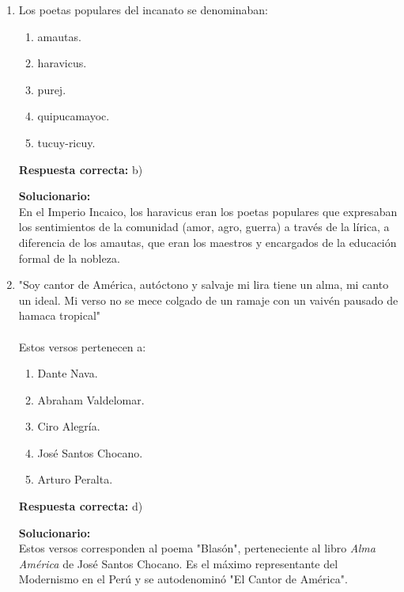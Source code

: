 \begin{enumerate}
	
	\item Los poetas populares del incanato se denominaban:
	\begin{enumerate}[label=\alph*)]
		\item amautas.
		\item haravicus.
		\item purej.
		\item quipucamayoc.
		\item tucuy-ricuy.
	\end{enumerate}
	\textbf{Respuesta correcta:} b)
	
	\vspace{2mm}
	\textbf{Solucionario:}\\
	En el Imperio Incaico, los haravicus eran los poetas populares que expresaban los sentimientos de la comunidad (amor, agro, guerra) a través de la lírica, a diferencia de los amautas, que eran los maestros y encargados de la educación formal de la nobleza.
	
	\vspace{6mm}
	
	\item "Soy cantor de América, autóctono y salvaje mi lira tiene un alma, mi canto un ideal. Mi verso no se mece colgado de un ramaje con un vaivén pausado de hamaca tropical" \\ \\ Estos versos pertenecen a:
	\begin{enumerate}[label=\alph*)]
		\item Dante Nava.
		\item Abraham Valdelomar.
		\item Ciro Alegría.
		\item José Santos Chocano.
		\item Arturo Peralta.
	\end{enumerate}
	\textbf{Respuesta correcta:} d)
	
	\vspace{2mm}
	\textbf{Solucionario:}\\
	Estos versos corresponden al poema "Blasón", perteneciente al libro \textit{Alma América} de José Santos Chocano. Es el máximo representante del Modernismo en el Perú y se autodenominó "El Cantor de América".
	
	\vspace{6mm}
	
\end{enumerate}



